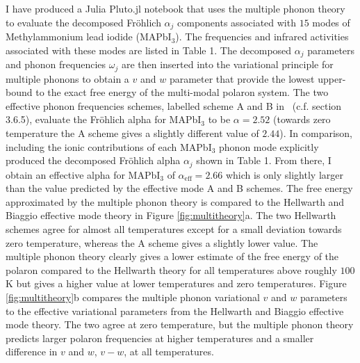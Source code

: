 I have produced a Julia Pluto.jl notebook that uses the multiple phonon theory to evaluate the decomposed Fr\"ohlich $\alpha_j$ components associated with $15$ modes of Methylammonium lead iodide (MAPbI$_3$). The frequencies and infrared activities associated with these modes are listed in Table 1. The decomposed $\alpha_j$ parameters and phonon frequencies $\omega_j$ are then inserted into the variational principle for multiple phonons to obtain a $v$ and $w$ parameter that provide the lowest upper-bound to the exact free energy of the multi-modal polaron system. The two effective phonon frequencies schemes, labelled scheme A and B in~\cite{hellwarth_mobility_1999} (c.f. section 3.6.5), evaluate the Fr\"ohlich alpha for MAPbI$_3$ to be $\alpha = 2.52$ (towards zero temperature the A scheme gives a slightly different value of $2.44$). In comparison, including the ionic contributions of each MAPbI$_3$ phonon mode explicitly produced the decomposed Fr\"ohlich alpha $\alpha_j$ shown in Table 1. From there, I obtain an effective alpha for MAPbI$_3$ of $\alpha_{\text{eff}} = 2.66$ which is only slightly larger than the value predicted by the effective mode A and B schemes. The free energy approximated by the multiple phonon theory is compared to the Hellwarth and Biaggio effective mode theory in Figure \ref{fig:multitheory}a. The two Hellwarth schemes agree for almost all temperatures except for a small deviation towards zero temperature, whereas the A scheme gives a slightly lower value. The multiple phonon theory clearly gives a lower estimate of the free energy of the polaron compared to the Hellwarth theory for all temperatures above roughly $100$K but gives a higher value at lower temperatures and zero temperatures. Figure \ref{fig:multitheory}b compares the multiple phonon variational $v$ and $w$ parameters to the effective variational parameters from the Hellwarth and Biaggio effective mode theory. The two agree at zero temperature, but the multiple phonon theory predicts larger polaron frequencies at higher temperatures and a smaller difference in $v$ and $w$, $v - w$, at all temperatures. 

